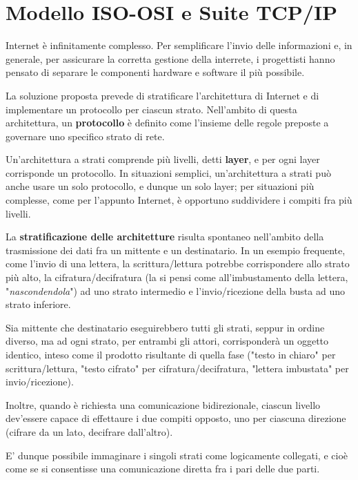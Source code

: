 \section{Modello ISO-OSI e Suite TCP/IP}
    Internet è infinitamente complesso. Per semplificare l'invio delle informazioni e, in generale, per assicurare la corretta gestione della interrete, i progettisti hanno pensato di separare le componenti hardware e software il più possibile.

    \vspace{3mm}
    
    La soluzione proposta prevede di stratificare l'architettura di Internet e di implementare un protocollo per ciascun strato. Nell'ambito di questa architettura, un \textbf{protocollo} è definito come l'insieme delle regole preposte a governare uno specifico strato di rete.
    
    \vspace{3mm}
    
    Un'architettura a strati comprende più livelli, detti \textbf{layer}, e per ogni layer corrisponde un protocollo. In situazioni semplici, un'architettura a strati può anche usare un solo protocollo, e dunque un solo layer; per situazioni più complesse, come per l'appunto Internet, è opportuno suddividere i compiti fra più livelli.
    
    La \textbf{stratificazione delle architetture} risulta spontaneo nell'ambito della trasmissione dei dati fra un mittente e un destinatario. In un esempio frequente, come l'invio di una lettera, la scrittura/lettura potrebbe corrispondere allo strato più alto, la cifratura/decifratura (la si pensi come all'imbustamento della lettera, "\textit{nascondendola}") ad uno strato intermedio e l'invio/ricezione della busta ad uno strato inferiore. 
    
    Sia mittente che destinatario eseguirebbero tutti gli strati, seppur in ordine diverso, ma ad ogni strato, per entrambi gli attori, corrisponderà un oggetto identico, inteso come il prodotto risultante di quella fase ("testo in chiaro" per scrittura/lettura, "testo cifrato" per cifratura/decifratura, "lettera imbustata" per invio/ricezione).
    
    Inoltre, quando è richiesta una comunicazione bidirezionale, ciascun livello dev'essere capace di effettaure i due compiti opposto, uno per ciascuna direzione (cifrare da un lato, decifrare dall'altro).
    
    E' dunque possibile immaginare i singoli strati come logicamente collegati, e cioè come se si consentisse una comunicazione diretta fra i pari delle due parti.
    
